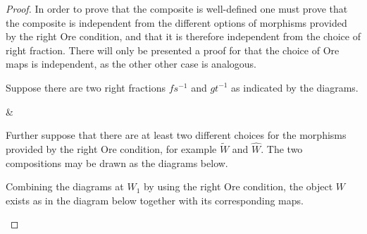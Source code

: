     \begin{proof}
        In order to prove that the composite is well-defined one must prove that the composite is independent from the different options of morphisms provided by the right Ore condition, and that it is therefore independent from the choice of right fraction. There will only be presented a proof for that the choice of Ore maps is independent, as the other other case is analogous.

        Suppose there are two right fractions $fs^{-1}$ and $gt^{-1}$ as indicated by the diagrams.

        \begin{center}
            \&
        \end{center}
        Further suppose that there are at least two different choices for the morphisms provided by the right Ore condition, for example $\widetilde{W}$ and $\widehat{W}$. The two compositions may be drawn as the diagrams below.
        \begin{center}
        \end{center}
        Combining the diagrams at $W_1$ by using the right Ore condition, the object $W$ exists as in the diagram below together with its corresponding maps. 
        \begin{center}
\end{center}
\end{proof}
